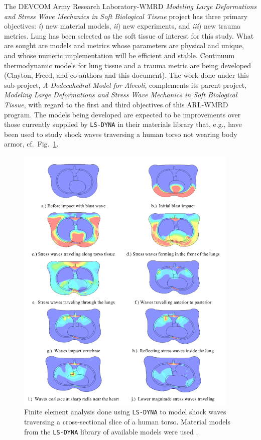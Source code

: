 The DEVCOM Army Research Laboratory-WMRD \textit{Modeling Large Deformations and Stress Wave Mechanics in Soft Biological Tissue\/} project has three primary objectives: \textit{i\/}) new material models, \textit{ii\/}) new experiments, and \textit{iii\/}) new trauma metrics.  Lung has been selected as the soft tissue of interest for this study.  What are sought are models and metrics whose parameters are physical and unique, and whose numeric implementation will be efficient and stable.  Continuum thermo\-dynamic models for lung tissue and a trauma metric are being developed (Clayton, Freed, and co-authors \cite{Clayton2019TRL,ClaytonFreed19,ClaytonFreed20,ClaytonFreed20a,Clayton2019AIP,claytonBM20,clayton2020TRL} and this document).  The work done under this sub-project, \textit{A Dodecahedral Model for Alveoli}, complements its parent project, \textit{Modeling Large Deformations and Stress Wave Mechanics in Soft Biological Tissue}, with regard to the first and third objectives of this ARL-WMRD program.  The models being developed are expected to be improvements over those currently supplied by \texttt{LS-DYNA} in their materials library that, e.g., have been used to study shock waves traversing a human torso not wearing body armor, cf.\ Fig.~\ref{figShockWaveInLung}.  

\begin{figure}
    \centering
    \includegraphics[width=0.95\textwidth]{figures/shockWaveInTorso.png}
    \caption{Finite element analysis done using \texttt{LS-DYNA}  to model shock waves traversing a cross-sectional slice of a human torso.  Material models from the \texttt{LS-DYNA}  library of available models were used \cite{Josey10}.}
    \label{figShockWaveInLung}
\end{figure}

